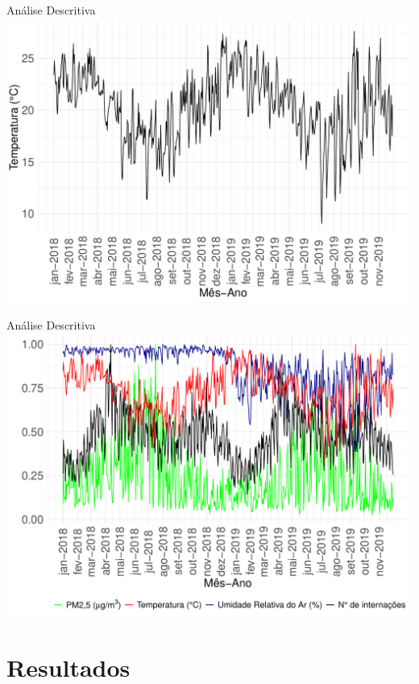 \documentclass[
  ignorenonframetext,
]{beamer}
\begin{document}
\begin{frame}{Análise Descritiva}
\label{anuxe1lise-descritiva-2}
\includegraphics[width=1\textwidth,height=\textheight]{apresentacao_files/figure-beamer/unnamed-chunk-10-1.pdf}
\end{frame}

\begin{frame}{Análise Descritiva}
\label{anuxe1lise-descritiva-3}
\includegraphics[width=1\textwidth,height=\textheight]{apresentacao_files/figure-beamer/unnamed-chunk-11-1.pdf}
\end{frame}

\section{Resultados}\label{resultados-1}
\end{document}
